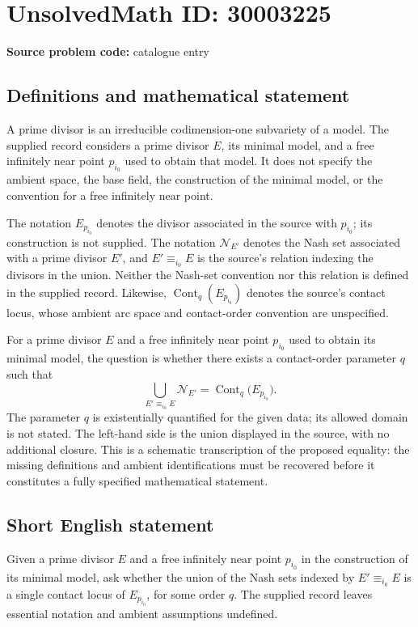 \documentclass[11pt]{article}
\begin{document}
\section*{UnsolvedMath ID: 30003225}
\textbf{Source problem code:} catalogue entry
\subsection{Definitions and mathematical statement}
A prime divisor is an irreducible codimension-one subvariety of a model. The supplied record considers a prime divisor \(E\), its minimal model, and a free infinitely near point \(p_{i_0}\) used to obtain that model. It does not specify the ambient space, the base field, the construction of the minimal model, or the convention for a free infinitely near point.

The notation \(E_{p_{i_0}}\) denotes the divisor associated in the source with \(p_{i_0}\); its construction is not supplied. The notation \(\mathcal N_{E'}\) denotes the Nash set associated with a prime divisor \(E'\), and \(E'\equiv_{i_0}E\) is the source's relation indexing the divisors in the union. Neither the Nash-set convention nor this relation is defined in the supplied record. Likewise, \(\operatorname{Cont}_q(E_{p_{i_0}})\) denotes the source's contact locus, whose ambient arc space and contact-order convention are unspecified.

For a prime divisor \(E\) and a free infinitely near point \(p_{i_0}\) used to obtain its minimal model, the question is whether there exists a contact-order parameter \(q\) such that
\[
\bigcup_{E'\equiv_{i_0}E}\mathcal N_{E'}
=
\operatorname{Cont}_q\bigl(E_{p_{i_0}}\bigr).
\]
The parameter \(q\) is existentially quantified for the given data; its allowed domain is not stated. The left-hand side is the union displayed in the source, with no additional closure. This is a schematic transcription of the proposed equality: the missing definitions and ambient identifications must be recovered before it constitutes a fully specified mathematical statement.
\subsection{Short English statement}
Given a prime divisor \(E\) and a free infinitely near point \(p_{i_0}\) in the construction of its minimal model, ask whether the union of the Nash sets indexed by \(E'\equiv_{i_0}E\) is a single contact locus of \(E_{p_{i_0}}\), for some order \(q\). The supplied record leaves essential notation and ambient assumptions undefined.
\end{document}
